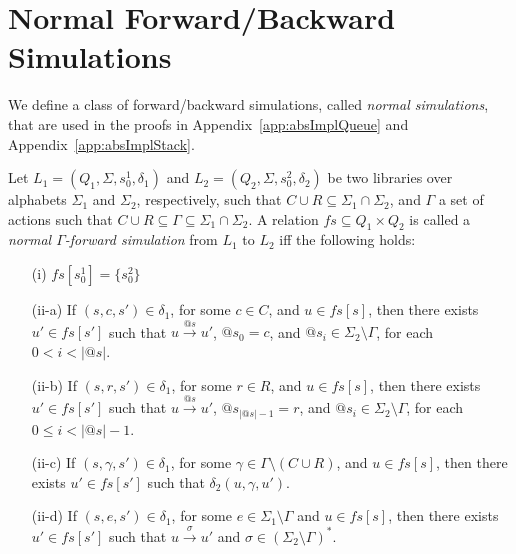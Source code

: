 \section{Normal Forward/Backward Simulations}\label{app:backSim}

We define a class of forward/backward simulations, called \emph{normal simulations}, that are used in the proofs in Appendix~\ref{app:absImplQueue} and Appendix~\ref{app:absImplStack}. 

\begin{dfn}
Let $L_1=(Q_1,\Sigma, s_0^1, \delta_1)$ and $L_2=(Q_2,\Sigma, s_0^2, \delta_2)$ be two libraries over alphabets $\Sigma_1$ and $\Sigma_2$, respectively, such that $C\cup R \subseteq \Sigma_1\cap\Sigma_2$, and $\Gamma$ a set of actions such that $C\cup R\subseteq \Gamma\subseteq \Sigma_1\cap\Sigma_2$. A relation $\mathit{fs} \subseteq Q_{1} \times Q_{2}$ is called a \emph{normal $\Gamma$-forward simulation} from $L_1$ to $L_2$ iff the following holds:
\begin{itemize}
\item[(i)] $\mathit{fs}[s_0^1] = \{s_0^2 \}$ 
\item[(ii-a)] If $(s,c,s') \in \delta_1$, for some $c\in C$, and $u \in \mathit{fs}[s]$, then there exists $u' \in \mathit{fs}[s']$ such that $u \xrightarrow{@s} u'$, $@s_0=c$, and $@s_i\in \Sigma_2\setminus\Gamma$, for each $0<i<|@s|$.
\item[(ii-b)] If $(s,r,s') \in \delta_{1}$, for some $r\in R$, and $u \in \mathit{fs}[s]$, then there exists $u' \in \mathit{fs}[s']$ such that $u \xrightarrow{@s} u'$, $@s_{|@s| -1}=r$, and $@s_i\in \Sigma_2\setminus\Gamma$, for each $0\leq i<|@s| -1$.
\item[(ii-c)] If $(s, \gamma , s') \in \delta_1$, for some $\gamma\in \Gamma\setminus (C\cup R)$, and $u \in fs[s]$, then there exists $u' \in fs[s']$ such that $\delta_2(u,\gamma, u')$. 
\item[(ii-d)] If $(s,e,s') \in \delta_1$, for some $e \in \Sigma_1\setminus \Gamma$ and $u \in \mathit{fs}[s]$, then there exists $u' \in \mathit{fs}[s']$ such that $u \xrightarrow{\sigma} u'$ and $\sigma\in (\Sigma_2\setminus\Gamma)^*$.  
\end{itemize}
\end{dfn}
